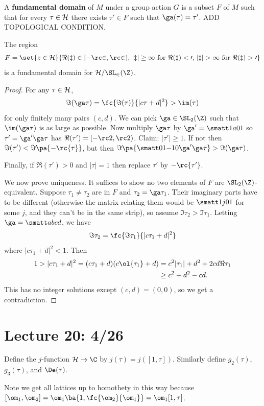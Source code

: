 \begin{df}
A \textbf{fundamental domain} of $M$ under a group action $G$ is a subset $F$ of $M$ such that for every $\tau\in \cal H$ there exists $\tau'\in F$ such that $\ga(\tau)=\tau'$. ADD TOPOLOGICAL CONDITION.
\end{df}
\begin{lem}
The region
\[
F=\set{z\in \cal H}{\Re(z)\in [-\rc 2,\rc 2),\,|z|\ge 1 \text{ for }\Re(z)<0,\,|z|>1 \text{ for }\Re(z)>0}
\]
is a fundamental domain for $\cal H/\SL_2(\Z)$.
\end{lem}
\begin{proof}
For any $\tau\in \cal H$, 
\[
\Im(\ga\tau)=\fc{\Im(\tau)}{|c\tau+d|^2}>\im(\tau)
\]
for only finitely many pairs $(c,d)$. We can pick $\ga\in \SL_2(\Z)$ such that $\im(\ga\tau)$ is as large as possible. Now multiply $\ga\tau$ by $\ga'=\smatt 1a01$ so $\tau'=\ga'\ga\tau$ has $\Re(\tau')=[-\rc 2,\rc2)$. Claim: $|\tau'|\ge 1$. If not then $\Im(\tau')<\Im\pa{-\rc{\tau}}$, but then $\Im\pa{\smatt 01{-1}0 \ga'\ga\tau}>\Im(\ga \tau)$.

Finally, if $\Re(\tau')>0$ and $|\tau|=1$ then replace $\tau'$ by $-\rc{\tau'}$.

We now prove uniqueness. It suffices to show no two elements of $F$ are $\SL_2(\Z)$-equivalent. Suppose $\tau_1\ne \tau_2$ are in $F$ and $\tau_2=\ga\tau_1$. Their imaginary parts have to be different (otherwise the matrix relating them would be $\smatt1j01$ for some $j$, and they can't be in the same strip), so assume $\Im \tau_2>\Im \tau_1$. Letting $\ga=\smatt abcd$, we have
\[
\Im \tau_2=\fc{\Im \tau_1}{|c\tau_1+d|^2}
\]
where $|c\tau_1+d|^2<1$. Then
\begin{align*}
1>|c\tau_1+d|^2=(c\tau_1+d)(c\ol{\tau_1}+d)
&= c^2|\tau_1|+d^2+2cd\Re \tau_1\\
&\ge c^2+d^2-cd.
\end{align*}
This has no integer solutions except $(c,d)=(0,0)$, so we get a contradiction.
\end{proof}
\section{Lecture 20: 4/26}
Define the $j$-function $\cal H\to \C$ by $j(\tau)=j([1,\tau])$. Similarly define $g_2(\tau)$, $g_3(\tau)$, and $\De(\tau)$.

Note we get all lattices up to homothety in this way because $[\om_1,\om_2]=\om_1\ba{1,\fc{\om_2}{\om_1}}=\om_1[1,\tau]$.

